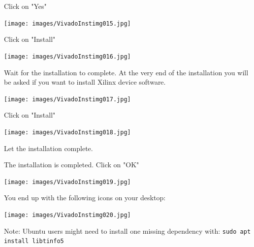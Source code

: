 \begin{minipage}{\linewidth}
  Click on "Yes"
  \\
  \begin{center}
    \texttt{[image: images/VivadoInstimg015.jpg]}
  \end{center}
\end{minipage}

\begin{minipage}{\linewidth}
  Click on "Install"
  \\
  \begin{center}
    \texttt{[image: images/VivadoInstimg016.jpg]}
  \end{center}
\end{minipage}

\begin{minipage}{\linewidth}
  Wait for the installation to complete. At the very end of the installation you will be asked if you want
  to install Xilinx device software.
  \\
  \begin{center}
    \texttt{[image: images/VivadoInstimg017.jpg]}
  \end{center}  
\end{minipage}

\begin{minipage}{\linewidth}
  Click on "Install"
  \\
  \begin{center}
    \texttt{[image: images/VivadoInstimg018.jpg]}
  \end{center}
  Let the installation complete.
\end{minipage}

\begin{minipage}{\linewidth}
  The installation is completed. Click on "OK"
  \\
  \begin{center}
    \texttt{[image: images/VivadoInstimg019.jpg]}
  \end{center}
\end{minipage}

\begin{minipage}{\linewidth}
  You end up with the following icons on your desktop:
  \\
  \begin{center}
    \texttt{[image: images/VivadoInstimg020.jpg]}
  \end{center}
  Note: Ubuntu users might need to install one missing dependency with: {\tt sudo apt install libtinfo5}
\end{minipage}


